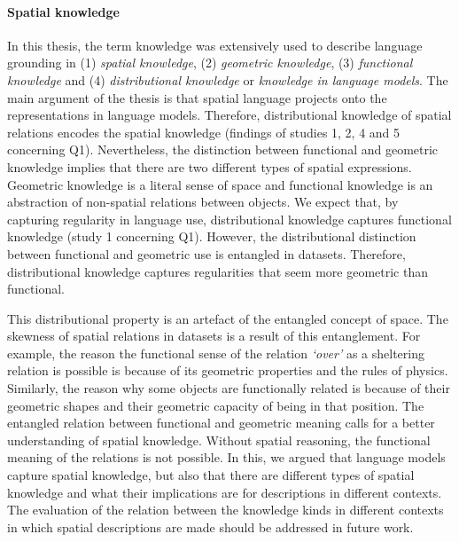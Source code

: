 \paragraph{Spatial knowledge}

In this thesis, the term knowledge was extensively used to
describe 
language grounding in (1) \emph{spatial knowledge}, (2) \emph{geometric knowledge}, (3) \emph{functional knowledge} and (4) \emph{distributional knowledge} or \emph{knowledge in language models}. 
The main argument of the thesis is that spatial language projects
onto the representations in language models. 
Therefore, distributional knowledge of spatial relations encodes the spatial knowledge (findings of studies 1, 2, 4 and 5 concerning Q1). 
Nevertheless, the distinction between functional and geometric knowledge implies that there are two different types of spatial expressions. 
Geometric knowledge is a literal sense of space and functional knowledge is an abstraction of non-spatial relations between objects. 
We expect that, by capturing regularity in language use, distributional knowledge captures functional knowledge (study 1 concerning Q1). 
However, the distributional distinction between functional and geometric use is entangled in datasets. 
Therefore, distributional knowledge captures regularities that seem more geometric than functional. 

This distributional property is an artefact of the entangled concept of space. The skewness of spatial relations in datasets is a result of this entanglement. 
For example, the reason the functional sense of the relation \emph{`over'} as a sheltering relation is possible is because of its geometric properties and the rules of physics. 
Similarly, the reason why some objects are functionally related is because of their geometric shapes and their geometric capacity of being in that position. 
The entangled relation between functional and geometric meaning calls for a better understanding of spatial knowledge. 
Without spatial reasoning, the functional meaning of the relations is not possible. 
In this, we argued that language models capture spatial knowledge, but 
also that there are different types of spatial knowledge and what their implications are for descriptions in different contexts.
The evaluation of the relation between the knowledge kinds in different contexts in which spatial descriptions are made should be addressed in future work.

